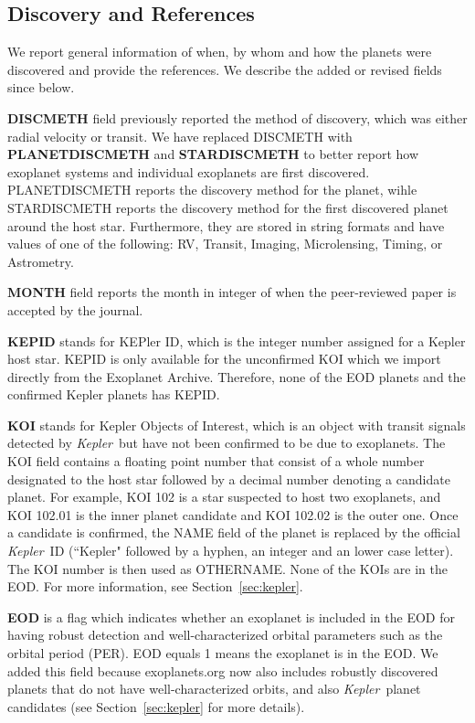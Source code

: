 \documentclass[11pt,preprint]{aastex}
\def\kepler{\textit{Kepler}}
\begin{document}
\begin{CJK*}{UTF8}{gbsn}
\subsection{Discovery and References}\label{sec:disc}

We report general information of when, by whom and how the planets
were discovered and provide the references. We describe the added or
revised fields since \cite{Wright2011} below.

{\bf DISCMETH} field previously reported the method of discovery,
which was either radial velocity or transit. We have replaced DISCMETH
with {\bf PLANETDISCMETH} and \mbox{{\bf STARDISCMETH}} to better
report how exoplanet systems and individual exoplanets are first
discovered. PLANETDISCMETH reports the discovery method for the
planet, wihle STARDISCMETH reports the discovery method for the first
discovered planet around the host star. Furthermore, they are stored
in string formats and have values of one of the following: RV,
Transit, Imaging, Microlensing, Timing, or Astrometry.

{\bf MONTH} field reports the month in integer of when the
peer-reviewed paper is accepted by the journal.

{\bf KEPID} stands for KEPler ID, which is the integer number assigned
for a Kepler host star. KEPID is only available for the unconfirmed
KOI which we import directly from the Exoplanet Archive. Therefore,
none of the EOD planets and the confirmed Kepler planets has KEPID.

{\bf KOI} stands for Kepler Objects of Interest, which is an object
with transit signals detected by \kepler\ but have not been confirmed
to be due to exoplanets. The KOI field contains a floating point
number that consist of a whole number designated to the host star
followed by a decimal number denoting a candidate planet. For example,
KOI 102 is a star suspected to host two exoplanets, and KOI 102.01 is
the inner planet candidate and KOI 102.02 is the outer one. Once a
candidate is confirmed, the NAME field of the planet is replaced by
the official \kepler\ ID (``Kepler" followed by a hyphen, an integer
and an lower case letter). The KOI number is then used as
OTHERNAME. None of the KOIs are in the EOD. For more information, see
Section~\ref{sec:kepler}.

{\bf EOD} is a flag which indicates whether an exoplanet is included
in the EOD for having robust detection and well-characterized orbital
parameters such as the orbital period (PER). EOD equals 1 means the
exoplanet is in the EOD. We added this field because exoplanets.org
now also includes robustly discovered planets that do not have
well-characterized orbits, and also \kepler\ planet candidates (see
Section~\ref{sec:kepler} for more details).


\end{CJK*}
\end{document}
